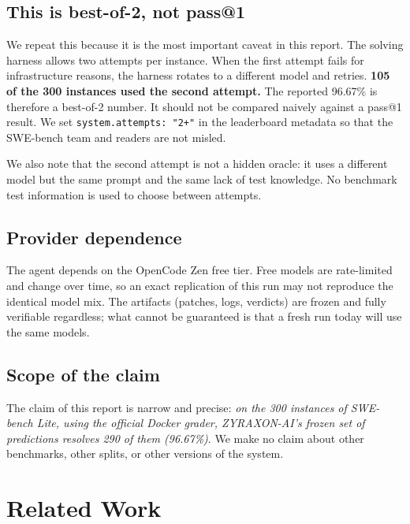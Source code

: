 \documentclass[11pt,a4paper]{article}
\begin{document}
\subsection{This is best-of-2, not pass@1}

We repeat this because it is the most important caveat in this report. The solving
harness allows two attempts per instance. When the first attempt fails for infrastructure
reasons, the harness rotates to a different model and retries. \textbf{105 of the 300
instances used the second attempt.} The reported 96.67\% is therefore a best-of-2 number.
It should not be compared naively against a pass@1 result. We set
\texttt{system.attempts: "2+"} in the leaderboard metadata so that the SWE-bench team and
readers are not misled.

We also note that the second attempt is not a hidden oracle: it uses a different model
but the same prompt and the same lack of test knowledge. No benchmark test information is
used to choose between attempts.

\subsection{Provider dependence}

The agent depends on the OpenCode Zen free tier. Free models are rate-limited and change
over time, so an exact replication of this run may not reproduce the identical model mix.
The artifacts (patches, logs, verdicts) are frozen and fully verifiable regardless; what
cannot be guaranteed is that a fresh run today will use the same models.

\subsection{Scope of the claim}

The claim of this report is narrow and precise: \emph{on the 300 instances of SWE-bench
Lite, using the official Docker grader, ZYRAXON-AI's frozen set of predictions
resolves 290 of them (96.67\%)}. We make no claim about other benchmarks, other splits, or
other versions of the system.

\section{Related Work}
\end{document}
